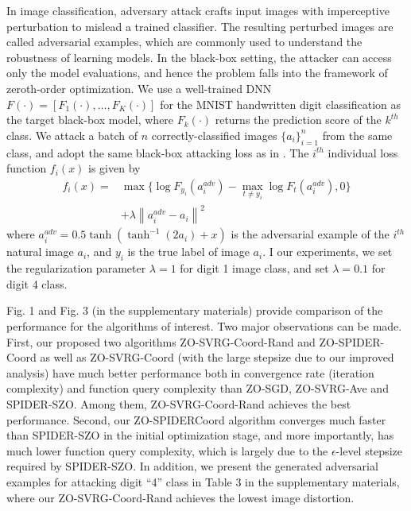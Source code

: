 \documentclass{article}
\newcommand{\norm}[1]{\left\lVert#1\right\rVert}
\theoremstyle{definition}
\theoremstyle{remark}
\begin{document}
{\color{Brown}
{
\color{Melon}
In image classification, adversary attack crafts input images
with imperceptive perturbation to mislead a trained classifier.
The resulting perturbed images are called adversarial examples,
which are commonly used to understand the robustness
of learning models. In the black-box setting, the attacker can
access only the model evaluations, and hence the problem
falls into the framework of zeroth-order optimization. We use a well-trained DNN
$F(\cdot) = [F_1(\cdot), \ldots, F_K(\cdot)]$ for
the MNIST handwritten digit classification as the target
black-box model, where $F_k(\cdot)$ returns the prediction score
of the $k^{th}$ class. We attack a batch of $n$ correctly-classified
images $\{a_i\}_{i=1}^n$ from the same class, and adopt the same
black-box attacking loss as in \cite{Chen et al. 2017; Liu et al.
2018b.}. The $i^{th}$ individual loss function $f_i(x)$ is given by
\begin{equation}
\begin{split}
f_i(x) =& \max \{\log F_{y_i} (a_i^{adv}) - \max_{t\neq y_i}\log F_{t} (a_i^{adv}), 0 \}\\
&+ \lambda \norm{a_i^{adv} - a_i}^2
\end{split}
\end{equation}
where $a_i^{adv}  = 0.5 \tanh(\tanh^{-1}(2a_i)+x)$ is the adversarial example of the $i^{th}$ natural image $a_i$, and $y_i$ is the true label of image $a_i$. I our experiments, we set the regularization parameter $\lambda  = 1$ for digit 1 image class, and set $\lambda = 0.1$ for digit 4 class. 

Fig. 1 and Fig. 3 (in the supplementary materials) provide
comparison of the performance for the algorithms of interest.
Two major observations can be made. First, our proposed
two algorithms ZO-SVRG-Coord-Rand and ZO-SPIDER-Coord as well as ZO-SVRG-Coord (with the large stepsize due to our improved analysis) have much better performance
both in convergence rate (iteration complexity) and
function query complexity than ZO-SGD, ZO-SVRG-Ave
and SPIDER-SZO. Among them, ZO-SVRG-Coord-Rand
achieves the best performance. Second, our ZO-SPIDERCoord
algorithm converges much faster than SPIDER-SZO
in the initial optimization stage, and more importantly, has
much lower function query complexity, which is largely
due to the $\epsilon$-level stepsize required by SPIDER-SZO. In
addition, we present the generated adversarial examples for
attacking digit “4” class in Table 3 in the supplementary
materials, where our ZO-SVRG-Coord-Rand achieves the
lowest image distortion.
}

}
\end{document}
